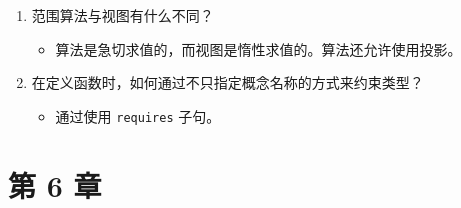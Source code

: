 \begin{enumerate}
\begin{itemize}
\item \texttt{const} 关键字把变量声明为常量。\texttt{constexpr} 关键字声明变量或函数是常量表达式，并尽可能在编译期求值。\texttt{Constexpr} 变量隐式地是 \texttt{const}。\texttt{consteval} 关键字强制进行常量求值，并标记必须在编译期求值的立即函数，对这类函数的任何调用都会产生编译期常量表达式。\texttt{constinit} 关键字强制进行常量初始化，保证静态变量或线程局部变量在任何动态初始化发生之前完成初始化，从而避免静态初始化顺序问题，但变量本身不一定是 \texttt{const}。
\end{itemize}
\item 范围算法与视图有什么不同？

\begin{itemize}
\item 算法是急切求值的，而视图是惰性求值的。算法还允许使用投影。
\end{itemize}
\item 在定义函数时，如何通过不只指定概念名称的方式来约束类型？

\begin{itemize}
\item 通过使用 \texttt{requires} 子句。
\end{itemize}
\end{enumerate}

\section*{第 6 章}

